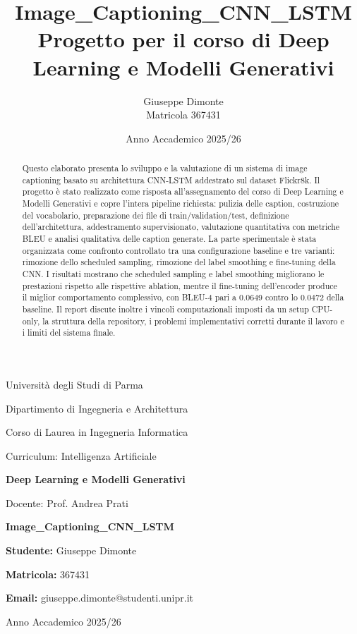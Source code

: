 \documentclass[12pt,a4paper]{article}
\title{\textbf{Image\_Captioning\_CNN\_LSTM}\\
\large Progetto per il corso di Deep Learning e Modelli Generativi}
\author{Giuseppe Dimonte \\ Matricola 367431}
\date{Anno Accademico 2025/26}
\begin{document}
\begin{titlepage}
\centering
{\Large Università degli Studi di Parma \par}
\vspace{0.2cm}
{\large Dipartimento di Ingegneria e Architettura \par}
\vspace{0.2cm}
{\large Corso di Laurea in Ingegneria Informatica \par}
{\large Curriculum: Intelligenza Artificiale \par}
\vspace{1.2cm}
{\Large \textbf{Deep Learning e Modelli Generativi} \par}
\vspace{0.3cm}
{\large Docente: Prof. Andrea Prati \par}
\vspace{1.2cm}
{\huge \textbf{Image\_Captioning\_CNN\_LSTM} \par}
\vspace{1.2cm}
{\large \textbf{Studente:} Giuseppe Dimonte \par}
{\large \textbf{Matricola:} 367431 \par}
{\large \textbf{Email:} giuseppe.dimonte@studenti.unipr.it \par}
\vfill
{\large Anno Accademico 2025/26 \par}
\end{titlepage}

\tableofcontents
\newpage

\begin{abstract}
Questo elaborato presenta lo sviluppo e la valutazione di un sistema di image captioning basato su architettura CNN-LSTM addestrato sul dataset Flickr8k. Il progetto è stato realizzato come risposta all'assegnamento del corso di Deep Learning e Modelli Generativi e copre l'intera pipeline richiesta: pulizia delle caption, costruzione del vocabolario, preparazione dei file di train/validation/test, definizione dell'architettura, addestramento supervisionato, valutazione quantitativa con metriche BLEU e analisi qualitativa delle caption generate. La parte sperimentale è stata organizzata come confronto controllato tra una configurazione baseline e tre varianti: rimozione dello scheduled sampling, rimozione del label smoothing e fine-tuning della CNN. I risultati mostrano che scheduled sampling e label smoothing migliorano le prestazioni rispetto alle rispettive ablation, mentre il fine-tuning dell'encoder produce il miglior comportamento complessivo, con BLEU-4 pari a 0.0649 contro lo 0.0472 della baseline. Il report discute inoltre i vincoli computazionali imposti da un setup CPU-only, la struttura della repository, i problemi implementativi corretti durante il lavoro e i limiti del sistema finale.
\end{abstract}
\end{document}

